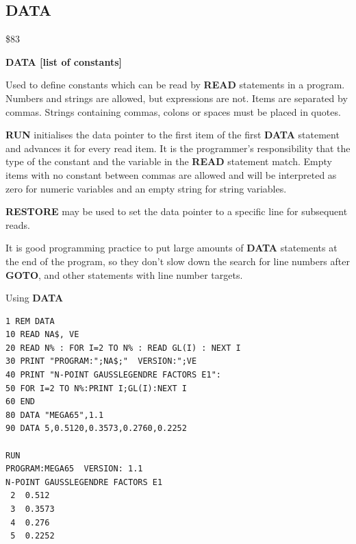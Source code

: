 
\newpage
\subsection{DATA}
\begin{description}[leftmargin=2cm,style=nextline]
\item [Token:] \$83
\item [Format:] {\bf DATA [list of constants]}
\item [Usage:] Used to define constants
               which can be read by {\bf READ} statements
               in a program. Numbers and strings are allowed, but expressions are not.
               Items are separated by commas.
               Strings containing commas, colons or spaces must be placed
               in quotes.

               {\bf RUN} initialises the data pointer
               to the first item of the first {\bf DATA} statement
               and advances it for every read item. It is the
               programmer's responsibility that the type of
               the constant and the variable in the {\bf READ}
               statement match. Empty items with no constant
               between commas are allowed and will be interpreted as
               zero for numeric variables and an empty string for
               string variables.

               {\bf RESTORE} may be used to set the
               data pointer to a specific line for subsequent
               reads.

\item [Remarks:] It is good programming practice to put large amounts of
               {\bf DATA} statements at the end of the program,
               so they don't slow down the search for line numbers
               after {\bf GOTO}, and other statements with line number targets.
\item [Example:] Using {\bf DATA}
\begin{tcolorbox}[colback=black,coltext=white]
\verbatimfont{\codefont}
\begin{verbatim}
1 REM DATA
10 READ NA$, VE
20 READ N% : FOR I=2 TO N% : READ GL(I) : NEXT I
30 PRINT "PROGRAM:";NA$;"  VERSION:";VE
40 PRINT "N-POINT GAUSSLEGENDRE FACTORS E1":
50 FOR I=2 TO N%:PRINT I;GL(I):NEXT I
60 END
80 DATA "MEGA65",1.1
90 DATA 5,0.5120,0.3573,0.2760,0.2252

RUN
PROGRAM:MEGA65  VERSION: 1.1
N-POINT GAUSSLEGENDRE FACTORS E1
 2  0.512
 3  0.3573
 4  0.276
 5  0.2252
\end{verbatim}
\end{tcolorbox}
\end{description}

